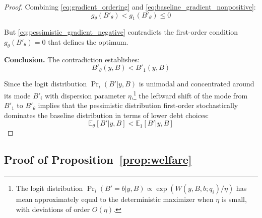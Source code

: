 \documentclass[12pt]{article}
\theoremstyle{plain}
\begin{document}
\begin{proof}
	Combining \eqref{eq:gradient_ordering} and
	\eqref{eq:baseline_gradient_nonpositive}:
	\begin{equation}
		g_\theta(B'_\theta) < g_1(B'_\theta) \leq 0 \label{eq:pessimistic_gradient_negative}
	\end{equation}

	But \eqref{eq:pessimistic_gradient_negative} contradicts the first-order
	condition $g_\theta(B'_\theta) = 0$ that defines the optimum.

	\textbf{Conclusion.} The contradiction establishes:
	\begin{equation}
		B'_\theta(y, B) < B'_1(y, B) \label{eq:deterministic_choice_ordering}
	\end{equation}

	Since the logit distribution $\Pr_i(B'|y,B)$ is unimodal and concentrated
	around its mode $B'_i$ with dispersion parameter $\eta$,\footnote{The logit
		distribution $\Pr_i(B' = b|y,B) \propto \exp(W(y,B,b;q_i)/\eta)$ has mean
		approximately equal to the deterministic maximizer when $\eta$ is small, with
		deviations of order $O(\eta)$.} the leftward shift of the mode from $B'_1$ to
	$B'_\theta$ implies that the pessimistic distribution first-order
	stochastically dominates the baseline distribution in terms of lower debt
	choices:
	\begin{equation}
		\mathbb{E}_\theta[B'|y, B] < \mathbb{E}_1[B'|y, B] \label{eq:expected_deleveraging}
	\end{equation}
\end{proof}

\subsection{Proof of Proposition~\ref{prop:welfare}}\label{app:proof_welfare}
\end{document}

